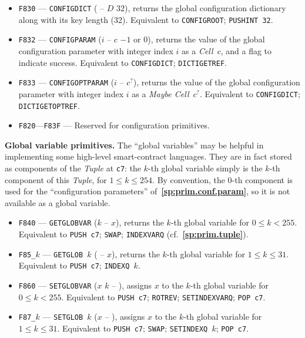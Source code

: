 \documentclass[12pt,oneside]{article}
\def\makepoint#1{\medbreak\noindent{\bf #1.\ }}
\def\nxsubpoint{\refstepcounter{subsubsection}%
  \smallbreak\makepoint{\thesubsubsection}}
\def\refpoint#1{{\rm\textbf{\ref{#1}}}}
\let\ptref=\refpoint
\def\emb#1{\textbf{#1.}}
\begin{document}
\begin{itemize}
\item {\tt F830} --- {\tt CONFIGDICT} ( -- $D$ $32$), returns the global configuration dictionary along with its key length (32). Equivalent to {\tt CONFIGROOT}; {\tt PUSHINT 32}.
\item {\tt F832} --- {\tt CONFIGPARAM} ($i$ -- $c$ $-1$ or $0$), returns the value of the global configuration parameter with integer index $i$ as a {\em Cell\/}~$c$, and a flag to indicate success. Equivalent to {\tt CONFIGDICT}; {\tt DICTIGETREF}.
\item {\tt F833} --- {\tt CONFIGOPTPARAM} ($i$ -- $c^?$), returns the value of the global configuration parameter with integer index $i$ as a {\em Maybe Cell\/}~$c^?$. Equivalent to {\tt CONFIGDICT}; {\tt DICTIGETOPTREF}.
\item {\tt F820}---{\tt F83F} --- Reserved for configuration primitives.
\end{itemize}

\nxsubpoint\emb{Global variable primitives}
The ``global variables'' may be helpful in implementing some high-level smart-contract languages. They are in fact stored as components of the {\em Tuple\/} at {\tt c7}: the $k$-th global variable simply is the $k$-th component of this {\em Tuple}, for $1\leq k\leq 254$. By convention, the $0$-th component is used for the ``configuration parameters'' of~\ptref{sp:prim.conf.param}, so it is not available as a global variable.
\begin{itemize}
\item {\tt F840} --- {\tt GETGLOBVAR} ($k$ -- $x$), returns the $k$-th global variable for $0\leq k<255$. Equivalent to {\tt PUSH c7}; {\tt SWAP}; {\tt INDEXVARQ} (cf.~\ptref{sp:prim.tuple}).
\item {\tt F85\_$k$} --- {\tt GETGLOB $k$} ( -- $x$), returns the $k$-th global variable for $1\leq k\leq 31$. Equivalent to {\tt PUSH c7}; {\tt INDEXQ $k$}.
\item {\tt F860} --- {\tt SETGLOBVAR} ($x$ $k$ -- ), assigns $x$ to the $k$-th global variable for $0\leq k<255$. Equivalent to {\tt PUSH c7}; {\tt ROTREV}; {\tt SETINDEXVARQ}; {\tt POP c7}.
\item {\tt F87\_$k$} --- {\tt SETGLOB $k$} ($x$ -- ), assigns $x$ to the $k$-th global variable for $1\leq k\leq 31$. Equivalent to {\tt PUSH c7}; {\tt SWAP}; {\tt SETINDEXQ $k$}; {\tt POP c7}.
\end{itemize}
\end{document}
